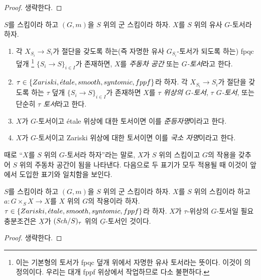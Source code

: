 \begin{proof}
생략한다.
\end{proof}

\begin{definition}
\label{definition-principal-homogeneous-space}
$S$를 스킴이라 하고 $(G, m)$을 $S$ 위의 군 스킴이라 하자. $X$를 $S$ 위의 유사 $G$-토서라 하자.
\begin{enumerate}
\item 각 $X_{S_i} \to S_i$가 절단을 갖도록 하는(즉 자명한 유사 $G_{S_i}$-토서가 되도록 하는) fpqc 덮개
\footnote{이는 기본형의 토서가 fpqc 덮개 위에서 자명한 유사 토서라는 뜻이다. 이것이
\cite[Expos\'e IV, 6.5]{SGA3}의 정의이다. 우리는 대개 fppf 위상에서 작업하므로 다소 불편하다.}
$\{S_i \to S\}_{i \in I}$가 존재하면, $X$를 {\it 주동차 공간} 또는 {\it $G$-토서}라고 한다.
\item $\tau \in \{Zariski, {\acute{e}tale}, smooth, syntomic, fppf\}$라 하자. 각 $X_{S_i} \to S_i$가 절단을 갖도록 하는
$\tau$ 덮개 $\{S_i \to S\}_{i \in I}$가 존재하면 $X$를 {\it $\tau$ 위상의 $G$-토서},
{\it $\tau$ $G$-토서}, 또는 단순히 {\it $\tau$ 토서}라고 한다.
\item $X$가 $G$-토서이고 \'etale 위상에 대한 토서이면 이를 {\it 준등자명}이라고 한다.
\item $X$가 $G$-토서이고 Zariski 위상에 대한 토서이면 이를 {\it 국소 자명}이라고 한다.
\end{enumerate}
\end{definition}

\noindent
때로 ``$X$를 $S$ 위의 $G$-토서라 하자''라는 말로, $X$가 $S$ 위의 스킴이고 $G$의 작용을 갖추어
$S$ 위의 주동차 공간이 됨을 나타낸다. 다음으로 두 표기가 모두 적용될 때 이것이 앞에서 도입한 표기와 일치함을 보인다.

\begin{lemma}
\label{lemma-torsor}
$S$를 스킴이라 하고 $(G, m)$을 $S$ 위의 군 스킴이라 하자. $X$를 $S$ 위의 스킴이라 하고
$a : G \times_S X \to X$를 $X$ 위의 $G$의 작용이라 하자.
$\tau \in \{Zariski, {\acute{e}tale}, smooth, syntomic, fppf\}$라 하자. $X$가 $\tau$-위상의 $G$-토서일 필요충분조건은
$\underline{X}$가 $(\mathit{Sch}/S)_\tau$ 위의 $\underline{G}$-토서인 것이다.
\end{lemma}

\begin{proof}
생략한다.
\end{proof}

